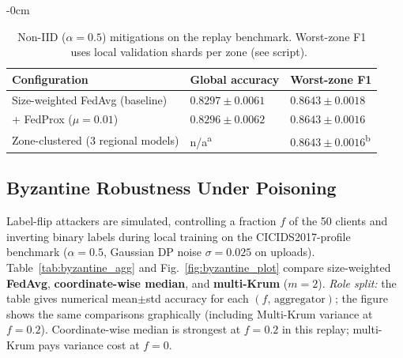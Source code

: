 \documentclass[sensors,article,submit,pdftex,moreauthors]{Definitions/mdpi}
\begin{document}
\begin{table}[H]
\caption{Non-IID ($\alpha{=}0.5$) mitigations on the replay benchmark. Worst-zone F1 uses local validation shards per zone (see script).~\label{tab:noniid_mitigation}}
	\begin{adjustwidth}{-\extralength}{0cm}
		\begin{tabularx}{\fulllength}{>{\raggedright\arraybackslash}X >{\centering\arraybackslash}X >{\centering\arraybackslash}X}
\toprule
\textbf{Configuration} & \textbf{Global accuracy} & \textbf{Worst-zone F1} \\
\midrule
Size-weighted FedAvg (baseline)      & $0.8297 \pm 0.0061$ & $0.8643 \pm 0.0018$ \\
+ FedProx ($\mu{=}0.01$)             & $0.8296 \pm 0.0062$ & $0.8643 \pm 0.0016$ \\
Zone-clustered (3 regional models)   & n/a\textsuperscript{a} & $0.8643 \pm 0.0016$\textsuperscript{b} \\
\bottomrule
\end{tabularx}
	\end{adjustwidth}
\end{table}

\subsection{Byzantine Robustness Under Poisoning}

Label-flip attackers are simulated, controlling a fraction $f$ of the 50 clients and inverting binary labels during local training on the CICIDS2017-profile benchmark ($\alpha{=}0.5$, Gaussian DP noise $\sigma{=}0.025$ on uploads). Table~\ref{tab:byzantine_agg} and Fig.~\ref{fig:byzantine_plot} compare size-weighted \textbf{FedAvg}, \textbf{coordinate-wise median}, and \textbf{multi-Krum} ($m{=}2$). \textit{Role split:} the table gives numerical mean$\pm$std accuracy for each $(f,\,\text{aggregator})$; the figure shows the same comparisons graphically (including Multi-Krum variance at $f{=}0.2$). Coordinate-wise median is strongest at $f{=}0.2$ in this replay; multi-Krum pays variance cost at $f{=}0$.
\end{document}
